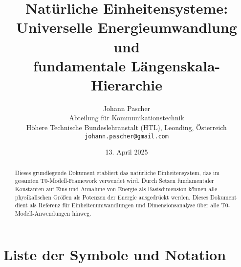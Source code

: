 \documentclass[11pt,a4paper]{article}
\title{Natürliche Einheitensysteme:\\
	Universelle Energieumwandlung und\\
	fundamentale Längenskala-Hierarchie}
\author{Johann Pascher\\
	Abteilung für Kommunikationstechnik\\
	Höhere Technische Bundeslehranstalt (HTL), Leonding, Österreich\\
	\texttt{johann.pascher@gmail.com}}
\date{13. April 2025}
\begin{document}
	
	\maketitle
	
	\begin{abstract}
		Dieses grundlegende Dokument etabliert das natürliche Einheitensystem, das im gesamten T0-Modell-Framework verwendet wird. Durch Setzen fundamentaler Konstanten auf Eins und Annahme von Energie als Basisdimension können alle physikalischen Größen als Potenzen der Energie ausgedrückt werden. Dieses Dokument dient als Referenz für Einheitenumwandlungen und Dimensionsanalyse über alle T0-Modell-Anwendungen hinweg.
	\end{abstract}
	
	\tableofcontents
	\newpage
	
	\section{Liste der Symbole und Notation}
	
\end{document}
